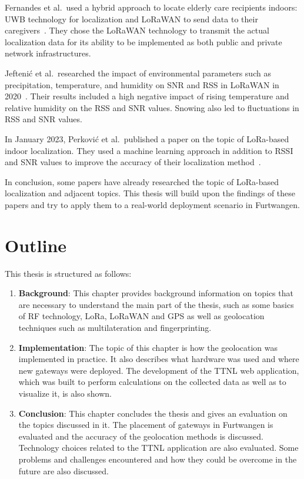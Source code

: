 Fernandes et al.\ used a hybrid approach to locate elderly care recipients indoors: \ac{UWB} technology for localization and \ac{LoRaWAN} to send data to their caregivers~\cite{fernandes_hybrid_2020}.
They chose the \ac{LoRaWAN} technology to transmit the actual localization data for its ability to be implemented as both public and private network infrastructures.

Jeftenić et al.\ researched the impact of environmental parameters such as precipitation, temperature, and humidity on \ac{SNR} and \ac{RSS} in \ac{LoRaWAN} in 2020~\cite{jeftenic_impact_2020}.
Their results included a high negative impact of rising temperature and relative humidity on the \ac{RSS} and \ac{SNR} values.
Snowing also led to fluctuations in \ac{RSS} and \ac{SNR} values.

In January 2023, Perković et al.\ published a paper on the topic of \ac{LoRa}-based indoor localization.
They used a machine learning approach in addition to \ac{RSSI} and \ac{SNR} values to improve the accuracy of their localization method~\cite{perkovic_machine_2023}.

In conclusion, some papers have already researched the topic of \ac{LoRa}-based localization and adjacent topics.
This thesis will build upon the findings of these papers and try to apply them to a real-world deployment scenario in Furtwangen.

\section{Outline}

This thesis is structured as follows:

\begin{enumerate}
      \item \textbf{Background}:
            This chapter provides background information on topics that are necessary to understand the main part of the thesis, such as some basics of \ac{RF} technology, \ac{LoRa}, \ac{LoRaWAN} and \ac{GPS} as well as geolocation techniques such as multilateration and fingerprinting.
      \item \textbf{Implementation}:
            The topic of this chapter is how the geolocation was implemented in practice.
            It also describes what hardware was used and where new gateways were deployed.
            The development of the \ac{TTNL} web application, which was built to perform calculations on the collected data as well as to visualize it, is also shown.
      \item \textbf{Conclusion}:
            This chapter concludes the thesis and gives an evaluation on the topics discussed in it.
            The placement of gateways in Furtwangen is evaluated and the accuracy of the geolocation methods is discussed.
            Technology choices related to the \ac{TTNL} application are also evaluated.
            Some problems and challenges encountered and how they could be overcome in the future are also discussed.
\end{enumerate}

